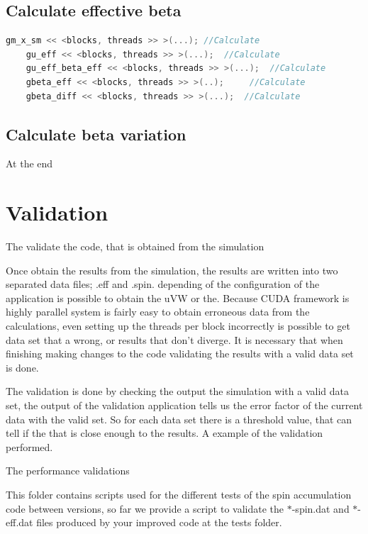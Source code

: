 \subsection{Calculate effective beta}


\begin{lstlisting}[language=C++, label={lst:rk4}, caption={Runge y Kutta integration}]	
    gm_x_sm << <blocks, threads >> >(...); //Calculate
    gu_eff << <blocks, threads >> >(...);  //Calculate 
    gu_eff_beta_eff << <blocks, threads >> >(...); 	//Calculate
    gbeta_eff << <blocks, threads >> >(..); 	//Calculate
    gbeta_diff << <blocks, threads >> >(...);  //Calculate             
\end{lstlisting}

\subsection{Calculate beta variation}

At the end 

\section{Validation}

The validate the code, that is obtained from the simulation

Once obtain the results from the simulation, the results are written into two separated data files; .eff and .spin. depending of the configuration of the application is possible to obtain the uVW or the. Because CUDA framework is highly parallel system is fairly easy to obtain erroneous data from the calculations, even setting up the threads per block incorrectly is possible to get data set that a wrong, or results that don't diverge. It is necessary that when finishing making changes to the code validating the results with a valid data set is done.

The validation is done by checking the output the simulation with a valid data set, the output of the validation application tells us the error factor of the current data with the valid set. So for each data set there is a threshold value, that can tell if the that is close enough to the results. A example of the validation performed.



The performance validations 

This folder contains scripts used for the different tests of the spin accumulation code 
between versions, so far we provide a script to validate the $*$-spin.dat and $*$-eff.dat
files produced by your improved code at the tests folder.


